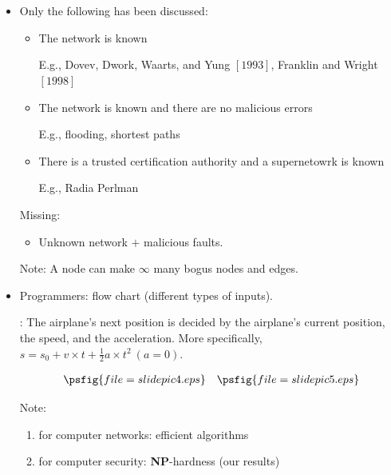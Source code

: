 \documentclass[portrait]{seminar}
\begin{document}
\newpage
\section*{}

\begin{itemize}
\item {}

Only the following has been discussed:
\begin{itemize}
\item The network is known 

{\small E.g., Dovev, Dwork, Waarts, and  Yung $[1993]$,
Franklin and Wright $[1998]$}
\item The network is known and there are no malicious
errors 

{\small E.g., flooding, shortest paths}
\item There is a trusted \underline{}
certification authority and a supernetowrk is known

{\small E.g., Radia Perlman}
\end{itemize}

Missing:
\begin{itemize}
\item Unknown network $+$ malicious faults.

\vskip 10pt
\end{itemize}
Note: A node can make $\infty$ many bogus nodes and edges.


\item {}

Programmers: flow chart (different types of inputs).

:
The airplane's next position is decided by
the airplane's current position, the speed, and the
acceleration. More specifically, 
$s=s_0+v\times t+\frac{1}{2}a\times t^2 \ (a=0)$.

$$\begin{array}{ll}
\psfig{file=slidepic4.eps} &
\psfig{file=slidepic5.eps}
\end{array}$$


\vskip 10pt
Note: \begin{enumerate}
\item for computer networks: efficient algorithms
\item for computer security: {\bf NP}-hardness (our results)
\end{enumerate}
\end{itemize}
\end{document}
